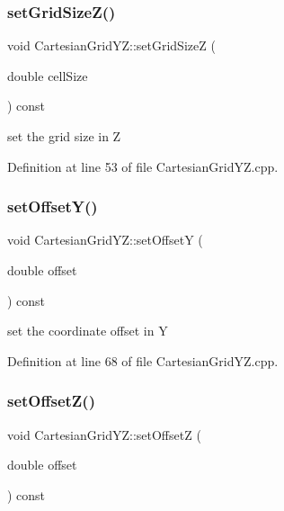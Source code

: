 \subsubsection{\texorpdfstring{set\+Grid\+Size\+Z()}{setGridSizeZ()}}
{\footnotesize\ttfamily void Cartesian\+Grid\+Y\+Z\+::set\+Grid\+SizeZ (\begin{DoxyParamCaption}\item[{double}]{cell\+Size }\end{DoxyParamCaption}) const}



set the grid size in Z 



Definition at line 53 of file Cartesian\+Grid\+Y\+Z.\+cpp.

\hypertarget{class_d_d4hep_1_1_geometry_1_1_cartesian_grid_y_z_a7c994c12c408be044ee7d1a73bae1fda}{}\label{class_d_d4hep_1_1_geometry_1_1_cartesian_grid_y_z_a7c994c12c408be044ee7d1a73bae1fda} 
\subsubsection{\texorpdfstring{set\+Offset\+Y()}{setOffsetY()}}
{\footnotesize\ttfamily void Cartesian\+Grid\+Y\+Z\+::set\+OffsetY (\begin{DoxyParamCaption}\item[{double}]{offset }\end{DoxyParamCaption}) const}



set the coordinate offset in Y 



Definition at line 68 of file Cartesian\+Grid\+Y\+Z.\+cpp.

\hypertarget{class_d_d4hep_1_1_geometry_1_1_cartesian_grid_y_z_ae40cf06145d7a3679b7f370924e59953}{}\label{class_d_d4hep_1_1_geometry_1_1_cartesian_grid_y_z_ae40cf06145d7a3679b7f370924e59953} 
\subsubsection{\texorpdfstring{set\+Offset\+Z()}{setOffsetZ()}}
{\footnotesize\ttfamily void Cartesian\+Grid\+Y\+Z\+::set\+OffsetZ (\begin{DoxyParamCaption}\item[{double}]{offset }\end{DoxyParamCaption}) const}




